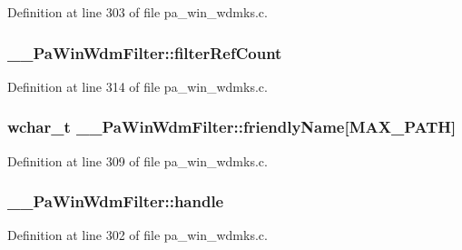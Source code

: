 Definition at line 303 of file pa\+\_\+win\+\_\+wdmks.\+c.

\subsubsection[{\texorpdfstring{filter\+Ref\+Count}{filterRefCount}}]{ \+\_\+\+\_\+\+Pa\+Win\+Wdm\+Filter\+::filter\+Ref\+Count}\hypertarget{struct_____pa_win_wdm_filter_a7d9dcc84bbd2a8220c4e4ed6dae36181}{}\label{struct_____pa_win_wdm_filter_a7d9dcc84bbd2a8220c4e4ed6dae36181}


Definition at line 314 of file pa\+\_\+win\+\_\+wdmks.\+c.

\subsubsection[{\texorpdfstring{friendly\+Name}{friendlyName}}]{\setlength{\rightskip}{0pt plus 5cm}wchar\+\_\+t \+\_\+\+\_\+\+Pa\+Win\+Wdm\+Filter\+::friendly\+Name\mbox{[}M\+A\+X\+\_\+\+P\+A\+TH\mbox{]}}\hypertarget{struct_____pa_win_wdm_filter_ad1b53f3170d7cb538e61642f3321ad81}{}\label{struct_____pa_win_wdm_filter_ad1b53f3170d7cb538e61642f3321ad81}


Definition at line 309 of file pa\+\_\+win\+\_\+wdmks.\+c.

\subsubsection[{\texorpdfstring{handle}{handle}}]{ \+\_\+\+\_\+\+Pa\+Win\+Wdm\+Filter\+::handle}\hypertarget{struct_____pa_win_wdm_filter_a86cd1691cdf7957417f949b54b122201}{}\label{struct_____pa_win_wdm_filter_a86cd1691cdf7957417f949b54b122201}


Definition at line 302 of file pa\+\_\+win\+\_\+wdmks.\+c.

